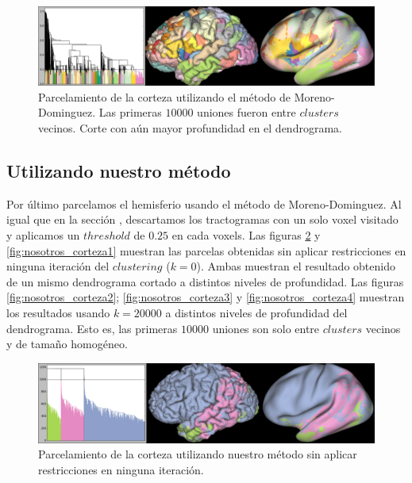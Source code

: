 \begin{figure}[h!]
    \includegraphics[width=\textwidth]{img/all_brain/moreno_10000_deep1.png}
    \caption{Parcelamiento de la corteza utilizando el m\'etodo de 
             Moreno-Dominguez. Las primeras $10000$ uniones fueron entre
             $clusters$ vecinos. Corte con a\'un mayor profundidad en el 
             dendrograma.}
    \label{fig:moreno_corteza2}             
\end{figure}

\subsection{Utilizando nuestro m\'etodo}
\label{sec:corteza_nuestro}

Por \'ultimo parcelamos el hemisferio usando el m\'etodo de 
Moreno-Dominguez. Al igual que en la secci\'on \label{ch:nuestro},
descartamos los tractogramas con un solo voxel visitado y aplicamos un
$threshold$ de $0.25$ en cada voxels. Las figuras 
\ref{fig:nosotros_corteza0} y \ref{fig:nosotros_corteza1} muestran 
las parcelas obtenidas sin aplicar restricciones en ninguna iteraci\'on
del $clustering$ ($k=0$). Ambas muestran el resultado obtenido de un mismo
dendrograma cortado a distintos niveles de profundidad. Las figuras 
\ref{fig:nosotros_corteza2}; \ref{fig:nosotros_corteza3} y
\ref{fig:nosotros_corteza4} muestran los resultados usando $k=20000$ a
distintos niveles de profundidad del dendrograma. Esto es, las primeras
$10000$ uniones son solo entre $clusters$ vecinos y de tama\~no 
homog\'eneo. 

\begin{figure}[h!]
    \includegraphics[width=\textwidth]{img/all_brain/logit_0.png}
    \caption{Parcelamiento de la corteza utilizando nuestro m\'etodo
             sin aplicar restricciones en ninguna iteraci\'on.}
    \label{fig:nosotros_corteza0}
\end{figure}
                                                                                                                        
